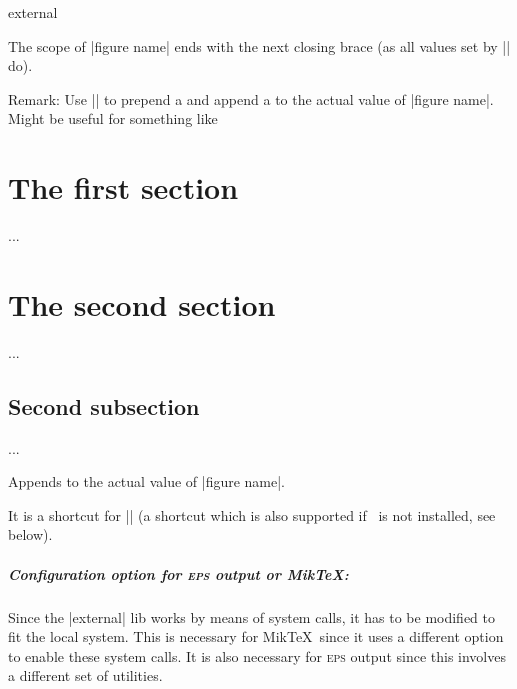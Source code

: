 {\begin{pgfplotslibrary}{external}
\begin{command}{}
\begin{codeexample}
\end{codeexample}
	The scope of |figure name| ends with the next closing brace (as all values set by |\tikzset| do).

	\medbreak
	Remark: Use || to prepend  a  and append a  to the actual value of |figure name|. Might be useful for something like
\begin{codeexample}
\tikzset{external/figure name=main}


\chapter{The first section}
{
	...
}

\chapter{The second section}
{
	...
	\section{Second subsection}
	{
		...
	}
}
\end{codeexample}
\end{command}

\begin{command}{\tikzappendtofigurename{}}
	Appends  to the actual value of |figure name|.

	It is a shortcut for || (a shortcut which is also supported if \tikzname\ is not installed, see below).
\end{command}


\paragraph{Configuration option for \textsc{eps} output or Mik\TeX:} Since the |external| lib works by means of system calls, it has to be modified to fit the local system. This is necessary for Mik\TeX\ since it uses a different option to enable these system calls. It is also necessary for \textsc{eps} output since this involves a different set of utilities.


\end{pgfplotslibrary}}
